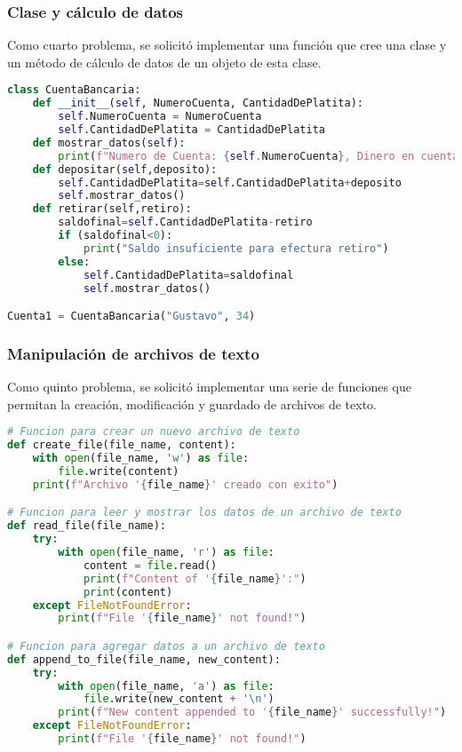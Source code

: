 \documentclass[conference]{IEEEtran}
\begin{document}
\subsubsection{Clase y cálculo de datos}
Como cuarto problema, se solicitó implementar una función
que cree una clase y un método de cálculo de datos de un
objeto de esta clase.
\begin{lstlisting}[language=Python, caption=Clase y cálculo]
class CuentaBancaria:
	def __init__(self, NumeroCuenta, CantidadDePlatita):
		self.NumeroCuenta = NumeroCuenta
		self.CantidadDePlatita = CantidadDePlatita
	def mostrar_datos(self):
		print(f"Numero de Cuenta: {self.NumeroCuenta}, Dinero en cuenta: {self.CantidadDePlatita}")
	def depositar(self,deposito):
		self.CantidadDePlatita=self.CantidadDePlatita+deposito
		self.mostrar_datos()
	def retirar(self,retiro):
		saldofinal=self.CantidadDePlatita-retiro
		if (saldofinal<0):
			print("Saldo insuficiente para efectura retiro")
		else:
			self.CantidadDePlatita=saldofinal
			self.mostrar_datos()

Cuenta1 = CuentaBancaria("Gustavo", 34)

\end{lstlisting}

\subsubsection{Manipulación de archivos de texto}
Como quinto problema, se solicitó implementar una serie de funciones
que permitan la creación, modificación y guardado de archivos de texto.
\begin{lstlisting}[language=Python, caption=Clase y cálculo]
# Funcion para crear un nuevo archivo de texto
def create_file(file_name, content):
	with open(file_name, 'w') as file:
		file.write(content)
	print(f"Archivo '{file_name}' creado con exito")

# Funcion para leer y mostrar los datos de un archivo de texto
def read_file(file_name):
	try:
		with open(file_name, 'r') as file:
			content = file.read()
			print(f"Content of '{file_name}':")
			print(content)
	except FileNotFoundError:
		print(f"File '{file_name}' not found!")

# Funcion para agregar datos a un archivo de texto
def append_to_file(file_name, new_content):
	try:
		with open(file_name, 'a') as file:
			file.write(new_content + '\n')
		print(f"New content appended to '{file_name}' successfully!")
	except FileNotFoundError:
		print(f"File '{file_name}' not found!")
	
\end{lstlisting}
\end{document}

